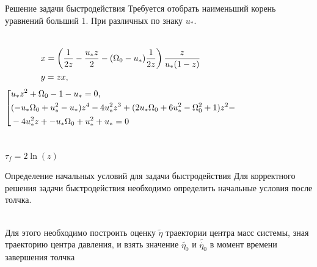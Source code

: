 \documentclass[10pt]{beamer}
\begin{document}
\begin{frame}{Решение задачи быстродействия}
	Требуется отобрать наименьший корень уравнений больший 1. При различных по знаку $u_*$.

	\begin{columns}
		\begin{equation}\label{x-y}
			{\begin{aligned}
					 & x=\left( \frac{1}{2z}-\frac{u_*z}{2}-(\Omega_0-u_*)\frac{1}{2z}\right)\frac{z}{u_*(1-z)} \hfill \\
					 & y=zx, \hfill                                                                                    \\
				\end{aligned}}
		\end{equation}
		\begin{equation}\label{koshisystem}
			\left[ {\begin{aligned}
						 & u_*z^2+\Omega _0-1-u_*=0, \hfill                                                            \\
						 & (-u_* \Omega _0+u_*^2-u_*)z^4-4 u_*^2z^3+(2 u_* \Omega _0+6 u_*^2-\Omega _0^2+1)z^2- \hfill \\
						 & -4 u_*^2z+-u_* \Omega _0+u_*^2+u_*=0                                                        \\
					\end{aligned}} \right.
		\end{equation}
	\end{columns}
	$\tau_f=2\ln(z)$

\end{frame}

\begin{frame}{Определение начальных условий для задачи быстродействия}
	Для корректного решения задачи быстродействия необходимо определить начальные условия после толчка.

	\hfill \\
	Для этого необходимо построить оценку $\tilde{\eta}$ траектории центра масс системы, зная траекторию центра давления,
	и взять значение $\tilde{\eta_0}$ и $\tilde{\dot{\eta_0}}$ в момент времени завершения толчка

\end{frame}
\end{document}
